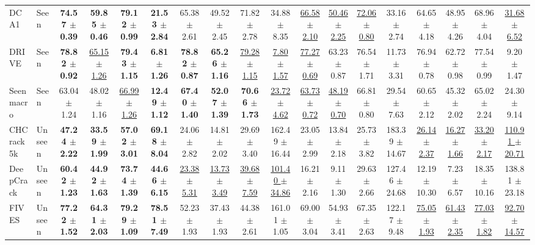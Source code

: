 \begin{table}[t]
{\begin{tabular}{llcccc|cccc|cccc|cccc}
DCA1 & Seen & \textbf{74.57 $\pm$ 0.39} & \textbf{59.85 $\pm$ 0.46} & \textbf{79.12 $\pm$ 0.99} & \textbf{21.53 $\pm$ 2.84} & 65.38 $\pm$ 2.61 & 49.52 $\pm$ 2.45 & 71.82 $\pm$ 2.78 & 34.88 $\pm$ 8.35 & \underline{66.58 $\pm$ 2.10} & \underline{50.46 $\pm$ 2.25} & \underline{72.06 $\pm$ 0.80} & 33.16 $\pm$ 2.74 & 64.65 $\pm$ 4.18 & 48.95 $\pm$ 4.26 & 68.96 $\pm$ 4.04 & \underline{31.68 $\pm$ 6.52} \\
DRIVE & Seen & \textbf{78.82 $\pm$ 0.92} & \underline{65.15 $\pm$ 1.26} & \textbf{79.43 $\pm$ 1.15} & \textbf{6.81 $\pm$ 1.26} & \textbf{78.82 $\pm$ 0.87} & \textbf{65.26 $\pm$ 1.16} & \underline{79.28 $\pm$ 1.15} & \underline{7.80 $\pm$ 1.57} & \underline{77.27 $\pm$ 0.69} & 63.23 $\pm$ 0.87 & 76.54 $\pm$ 1.71 & 11.73 $\pm$ 3.31 & 76.94 $\pm$ 0.78 & 62.72 $\pm$ 0.98 & 77.54 $\pm$ 0.99 & 9.20 $\pm$ 1.47 \\
\midrule
Seen macro & Seen & 63.04 $\pm$ 1.24 & 48.02 $\pm$ 1.16 & \underline{66.99 $\pm$ 1.26} & \textbf{12.49 $\pm$ 1.12} & \textbf{67.40 $\pm$ 1.40} & \textbf{52.07 $\pm$ 1.39} & \textbf{70.66 $\pm$ 1.73} & \underline{23.72 $\pm$ 4.62} & \underline{63.73 $\pm$ 0.72} & \underline{48.19 $\pm$ 0.70} & 66.81 $\pm$ 0.80 & 29.54 $\pm$ 7.63 & 60.65 $\pm$ 2.12 & 45.32 $\pm$ 2.02 & 65.02 $\pm$ 2.24 & 24.30 $\pm$ 9.14 \\
\midrule
CHCrack5k & Unseen & \textbf{47.24 $\pm$ 2.22} & \textbf{33.59 $\pm$ 1.99} & \textbf{57.02 $\pm$ 3.01} & \textbf{69.18 $\pm$ 8.04} & 24.06 $\pm$ 2.82 & 14.81 $\pm$ 2.02 & 29.69 $\pm$ 3.40 & 162.49 $\pm$ 16.44 & 23.05 $\pm$ 2.99 & 13.84 $\pm$ 2.18 & 25.73 $\pm$ 3.82 & 183.39 $\pm$ 14.67 & \underline{26.14 $\pm$ 2.37} & \underline{16.27 $\pm$ 1.66} & \underline{33.20 $\pm$ 2.17} & \underline{110.91 $\pm$ 20.71} \\
DeepCrack & Unseen & \textbf{60.42 $\pm$ 1.23} & \textbf{44.92 $\pm$ 1.63} & \textbf{73.74 $\pm$ 1.39} & \textbf{44.66 $\pm$ 6.15} & \underline{23.38 $\pm$ 5.31} & \underline{13.73 $\pm$ 3.49} & \underline{39.68 $\pm$ 7.59} & \underline{101.40 $\pm$ 34.86} & 16.21 $\pm$ 2.16 & 9.11 $\pm$ 1.30 & 29.63 $\pm$ 2.66 & 127.46 $\pm$ 24.68 & 12.19 $\pm$ 10.30 & 7.23 $\pm$ 6.57 & 18.35 $\pm$ 10.16 & 138.81 $\pm$ 23.18 \\
FIVES & Unseen & \textbf{77.22 $\pm$ 1.52} & \textbf{64.31 $\pm$ 2.03} & \textbf{79.29 $\pm$ 1.09} & \textbf{78.51 $\pm$ 7.49} & 52.23 $\pm$ 1.93 & 37.43 $\pm$ 1.93 & 44.38 $\pm$ 2.61 & 161.01 $\pm$ 1.05 & 69.00 $\pm$ 3.04 & 54.93 $\pm$ 3.41 & 67.35 $\pm$ 2.63 & 122.17 $\pm$ 9.48 & \underline{75.05 $\pm$ 1.93} & \underline{61.43 $\pm$ 2.35} & \underline{77.03 $\pm$ 1.82} & \underline{92.70 $\pm$ 14.57} \\

\end{tabular}}
\end{table}
